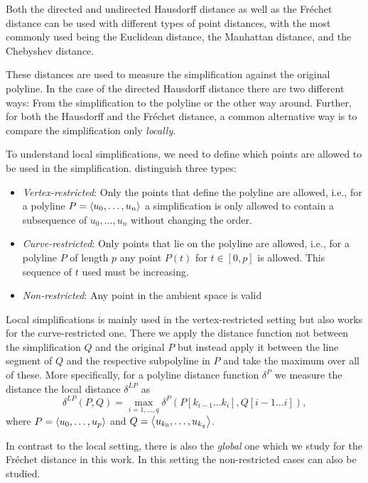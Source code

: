 Both the directed and undirected Hausdorff distance as well as the Fréchet distance can be used with different types of point distances, with the most commonly used being the Euclidean distance, the Manhattan distance, and the Chebyshev distance.

These distances are used to measure the simplification against the original polyline. In the case of the directed Hausdorff distance there are two different ways: From the simplification to the polyline or the other way around. 
Further, for both the Hausdorff and the Fréchet distance, a common alternative way is to compare the simplification only \emph{locally}.

To understand local simplifications, we need to define which points are allowed to be used in the simplification. \citeauthor{global_curve_simplification} distinguish three types:
\begin{itemize}
  \item \emph{Vertex-restricted}: Only the points that define the polyline are allowed, i.e., for a polyline \(P = \left\langle u_0, \dots, u_n\right\rangle\) a simplification is only allowed to contain a subsequence of \(u_0, \dots, u_n\) without changing the order.
	\item \emph{Curve-restricted}: Only points that lie on the polyline are allowed, i.e., for a polyline \(P\) of length \(p\) any point \(P(t)\) for \(t \in [0, p]\) is allowed. This sequence of \(t\) used must be increasing.
	\item \emph{Non-restricted}: Any point in the ambient space is valid 
\end{itemize}

Local simplifications is mainly used in the vertex-restricted setting but also works for the curve-restricted one. There we apply the distance function not between the simplification \(Q\) and the original \(P\) but instead apply it between the line segment of \(Q\) and the respective subpolyline in \(P\) and take the maximum over all of these. More specifically, for a polyline distance function \(\delta^P\) we measure the distance the local distance \(\delta^{LP}\) as 
\[\delta^{LP}(P, Q) = \max_{i = 1, \dots, q} \delta^P(P[k_{i-1}\dots k_i], Q[i-1 \dots i]),\]
where \(P = \left\langle u_0, \dots, u_p\right\rangle\) and \(Q = \left\langle u_{k_0}, \dots, u_{k_q}\right\rangle\).

In contrast to the local setting, there is also the \emph{global} one which we study for the Fréchet distance in this work. In this setting the non-restricted cases can also be studied.

